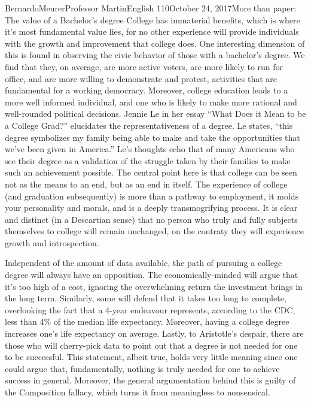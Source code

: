 \documentclass[12pt,letterpaper]{article}
\begin{document}
\begin{mla}{Bernardo}{Meurer}{Professor Martin}{English 110}{October 24, 2017}{More than paper: The value of a Bachelor's degree}
        College has immaterial benefits, which is where it's most fundamental value lies, for no other experience will provide individuals with the growth and improvement that college does. One interesting dimension of this is found in observing the civic behavior of those with a bachelor's degree. We find that they, on average, are more active voters, are more likely to run for office, and are more willing to demonstrate and protest, activities that are fundamental for a working democracy. Moreover, college education leads to a more well informed individual, and one who is likely to make more rational and well-rounded political decisions. Jennie Le in her essay ``What Does it Mean to be a College Grad?'' elucidates the representativeness of a degree. Le states, ``this degree symbolizes my family being able to make and take the opportunities that we've been given in America.'' Le's thoughts echo that of many Americans who see their degree as a validation of the struggle taken by their families to make such an achievement possible. The central point here is that college can be seen not as the means to an end, but as an end in itself. The experience of college (and graduation subsequently) is more than a pathway to employment, it molds your personality and morals, and is a deeply transmogrifying process. It is clear and distinct (in a Descartian sense) that no person who truly and fully subjects themselves to college will remain unchanged, on the contraty they will experience growth and introspection.
    
        Independent of the amount of data available, the path of pursuing a college degree will always have an opposition. The economically-minded will argue that it's too high of a cost, ignoring the overwhelming return the investment brings in the long term. Similarly, some will defend that it takes too long to complete, overlooking the fact that a 4-year endeavour represents, according to the CDC, less than 4\% of the median life expectancy. Moreover, having a college degree increases one's life expectancy on average. Lastly, to Aristotle's despair, there are those who will cherry-pick data to point out that a degree is not needed for one to be successful. This statement, albeit true, holds very little meaning since one could argue that, fundamentally, nothing is truly needed for one to achieve success in general. Moreover, the general argumentation behind this is guilty of the Composition fallacy, which turns it from meaningless to nonsensical.
    

\end{mla}
\end{document}
